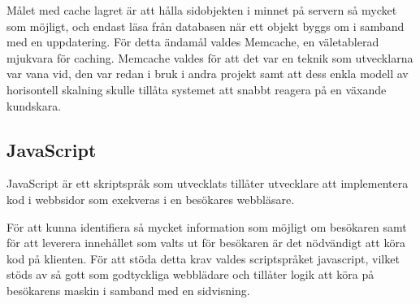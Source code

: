 Målet med cache lagret är att hålla sidobjekten i minnet på servern så mycket som möjligt, och endast läsa från databasen när ett objekt byggs om i samband med en uppdatering. För detta ändamål valdes Memcache, en väletablerad mjukvara för caching. Memcache valdes för att det var en teknik som utvecklarna var vana vid, den var redan i bruk i andra projekt samt att dess enkla modell av horisontell skalning skulle tillåta systemet att snabbt reagera på en växande kundskara.

\subsection{JavaScript}

JavaScript är ett skriptspråk som utvecklats tillåter utvecklare att implementera kod i webbsidor som exekveras i en besökares webbläsare. 

För att kunna identifiera så mycket information som möjligt om besökaren samt för att leverera innehållet som valts ut för besökaren är det nödvändigt att köra kod på klienten. För att stöda detta krav valdes scriptspråket javascript, vilket stöds av så gott som godtyckliga webblädare och tillåter logik att köra på besökarens maskin i samband med en sidvisning.


